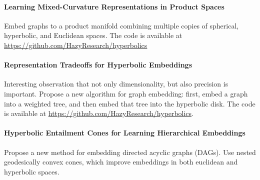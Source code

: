 \documentclass{article}
\begin{document}
\paragraph{Learning Mixed-Curvature Representations in Product Spaces~\cite{gu2019learning}}

Embed graphs to a product manifold combining multiple copies of spherical,
hyperbolic, and Euclidean spaces. The code is available at \url{https://github.com/HazyResearch/hyperbolics}

\paragraph{Representation Tradeoffs for Hyperbolic Embeddings~\cite{sala2018representation}}

Interesting observation that not only dimensionality, but also precision is important.
Propose a new algorithm for graph embedding: first, embed a graph into a weighted tree, and then embed that tree into the hyperbolic disk. The code is available at \url{https://github.com/HazyResearch/hyperbolics}.

\paragraph{Hyperbolic Entailment Cones for Learning Hierarchical Embeddings~\cite{ganea2018hyperbolic}}

Propose a new method for embedding directed acyclic graphs (DAGs). 
Use nested geodesically convex cones, which improve embeddings in both euclidean and hyperbolic spaces. 



\end{document}
